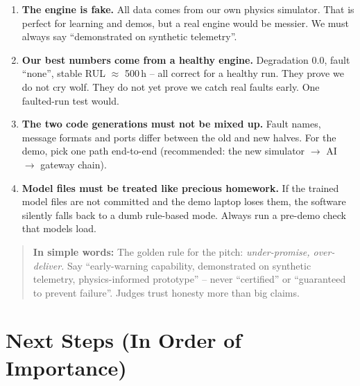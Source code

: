 \documentclass[11pt]{article}
\newenvironment{simplebox}
  {\par\medskip\noindent\begin{quote}\color{blue!55!black}\small
   \textbf{\textsf{In simple words:}}\space\space}
  {\end{quote}\medskip}
\begin{document}
\begin{enumerate}[nosep]
  \item \textbf{The engine is fake.} All data comes from our own physics
        simulator. That is perfect for learning and demos, but a real
        engine would be messier. We must always say ``demonstrated on
        synthetic telemetry''.
  \item \textbf{Our best numbers come from a healthy engine.} Degradation
        0.0, fault ``none'', stable RUL $\approx$ 500\,h -- all correct for
        a healthy run. They prove we do not cry wolf. They do not yet
        prove we catch real faults early. One faulted-run test would.
  \item \textbf{The two code generations must not be mixed up.} Fault
        names, message formats and ports differ between the old and new
        halves. For the demo, pick one path end-to-end (recommended: the
        new simulator $\rightarrow$ AI $\rightarrow$ gateway chain).
  \item \textbf{Model files must be treated like precious homework.} If
        the trained model files are not committed and the demo laptop
        loses them, the software silently falls back to a dumb rule-based
        mode. Always run a pre-demo check that models load.
\end{enumerate}

\begin{simplebox}
The golden rule for the pitch: \emph{under-promise, over-deliver.} Say
``early-warning capability, demonstrated on synthetic telemetry,
physics-informed prototype'' -- never ``certified'' or ``guaranteed to
prevent failure''. Judges trust honesty more than big claims.
\end{simplebox}

\section{Next Steps (In Order of Importance)}
\end{document}
